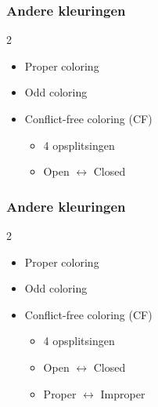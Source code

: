 \documentclass
[kulak] %
{kulakbeamer}
\begin{document}
	\begin{frame}
		\frametitle{Andere kleuringen}
		
		
		\begin{multicols}{2}
			
			\begin{itemize}
				\item Proper coloring
				\item Odd coloring
				\item Conflict-free coloring (CF)
				\pause
				\begin{itemize}
					\item 4 opsplitsingen
					\item Open $\longleftrightarrow$ Closed
				\end{itemize}
			\end{itemize}
			
			\vspace*{\fill}\null

			\begin{center}
				\scalebox{.75}{}
			\end{center}
			
			\vspace*{\fill}\null
			
			
		\end{multicols}
		
		
	\end{frame}
	
	\begin{frame}
		\frametitle{Andere kleuringen}
		
		
		\begin{multicols}{2}
			
			\begin{itemize}
				\item Proper coloring
				\item Odd coloring
				\item Conflict-free coloring (CF)
				\begin{itemize}
					\item 4 opsplitsingen
					\item Open $\longleftrightarrow$ Closed
					\item Proper $\longleftrightarrow$ Improper					
				\end{itemize}
			\end{itemize}
			
			\vspace*{\fill}\null
			
			\begin{center}
				\scalebox{.75}{}
			\end{center}
			
			\vspace*{\fill}\null
			
			
		\end{multicols}
		
		
	\end{frame}
	
\end{document}
